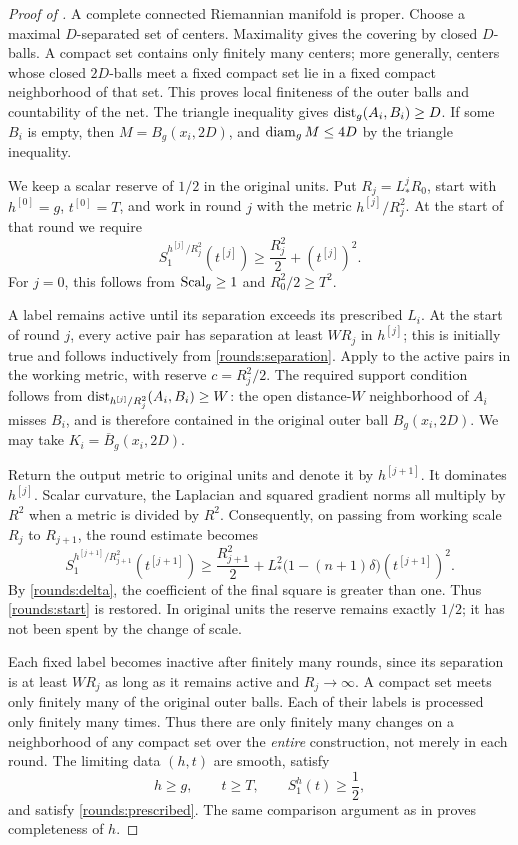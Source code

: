 \begin{proof}[Proof of ]
A complete connected Riemannian manifold is proper. Choose a maximal
\(D\)-separated set of centers. Maximality gives the covering by closed
\(D\)-balls. A compact set contains only finitely many centers; more
generally, centers whose closed \(2D\)-balls meet a fixed compact set
lie in a fixed compact neighborhood of that set. This proves local
finiteness of the outer balls and countability of the net. The triangle
inequality gives \(\operatorname{dist}_g(A_i,B_i)\ge D\). If some \(B_i\) is empty,
then \(M=B_g(x_i,2D)\), and \(\operatorname{diam}_g M\le4D\) by the triangle
inequality.

We keep a scalar reserve of \(1/2\) in the original units. Put
\(R_j=L_*^jR_0\), start with \(h^{[0]}=g\), \(t^{[0]}=T\), and work in
round \(j\) with the metric \(h^{[j]}/R_j^2\). At the start of that
round we require
\begin{equation}\label{rounds:start}
 S^{h^{[j]}/R_j^2}_1(t^{[j]})
 \ge \frac{R_j^2}{2}+(t^{[j]})^2.
\end{equation}
For \(j=0\), this follows from \(\operatorname{Scal}_g\ge1\) and
\(R_0^2/2\ge T^2\).

A label remains active until its separation exceeds its prescribed
\(L_i\). At the start of round \(j\), every active pair has separation
at least \(WR_j\) in \(h^{[j]}\); this is initially true and follows
inductively from \eqref{rounds:separation}. Apply  to
the active pairs in the working metric, with reserve \(c=R_j^2/2\).
The required support condition follows from
\(\operatorname{dist}_{h^{[j]}/R_j^2}(A_i,B_i)\ge W\): the open distance-\(W\)
neighborhood of \(A_i\) misses \(B_i\), and is therefore contained in
the original outer ball \(B_g(x_i,2D)\). We may take
\(K_i=\overline B_g(x_i,2D)\).

Return the output metric to original units and denote it by
\(h^{[j+1]}\). It dominates \(h^{[j]}\). Scalar curvature, the
Laplacian and squared gradient norms all multiply by \(R^2\) when a
metric is divided by \(R^2\). Consequently, on passing from working
scale \(R_j\) to \(R_{j+1}\), the round estimate becomes
\[
 S^{h^{[j+1]}/R_{j+1}^2}_1(t^{[j+1]})
 \ge \frac{R_{j+1}^2}{2}
 +L_*^2\bigl(1-(n+1)\delta\bigr)(t^{[j+1]})^2.
\]
By \eqref{rounds:delta}, the coefficient of the final square is greater
than one. Thus \eqref{rounds:start} is restored. In original units the
reserve remains exactly \(1/2\); it has not been spent by the change
of scale.

Each fixed label becomes inactive after finitely many rounds, since
its separation is at least \(WR_j\) as long as it remains active and
\(R_j\to\infty\). A compact set meets only finitely many of the
original outer balls. Each of their labels is processed only finitely
many times. Thus there are only finitely many changes on a neighborhood
of any compact set over the \emph{entire} construction, not merely in
each round. The limiting data \((h,t)\) are smooth, satisfy
\[
 h\ge g,\qquad t\ge T,\qquad S^{h}_1(t)\ge\frac12,
\]
and satisfy \eqref{rounds:prescribed}. The same comparison argument as
in  proves completeness of \(h\).


\end{proof}
